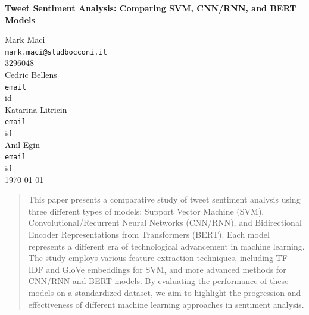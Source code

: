 \documentclass[12pt]{article}
\begin{document}
\begin{titlepage}
    \centering
    \vspace*{1in}
    
    \large
    \textbf{Tweet Sentiment Analysis: Comparing SVM, CNN/RNN, and BERT Models}

    
    \vspace{0.5in}
    Mark Maci \\
    \texttt{mark.maci@studbocconi.it} \\
    3296048\\
    
    \vspace{0.5in}
    Cedric Bellens \\
    \texttt{email} \\
    id \\

    \vspace{0.5in}
    Katarina Litricin \\
    \texttt{email} \\
    id \\
    
    \vspace{0.5in}
    Anil Egin \\
    \texttt{email} \\
    id \\
    
    \vfill
    \large
    \today
    
\end{titlepage}

\begin{abstract}
This paper presents a comparative study of tweet sentiment analysis using three different types of models: Support Vector Machine (SVM), Convolutional/Recurrent Neural Networks (CNN/RNN), and Bidirectional Encoder Representations from Transformers (BERT). Each model represents a different era of technological advancement in machine learning. The study employs various feature extraction techniques, including TF-IDF and GloVe embeddings for SVM, and more advanced methods for CNN/RNN and BERT models. By evaluating the performance of these models on a standardized dataset, we aim to highlight the progression and effectiveness of different machine learning approaches in sentiment analysis.
\end{abstract}
    
\end{document}
